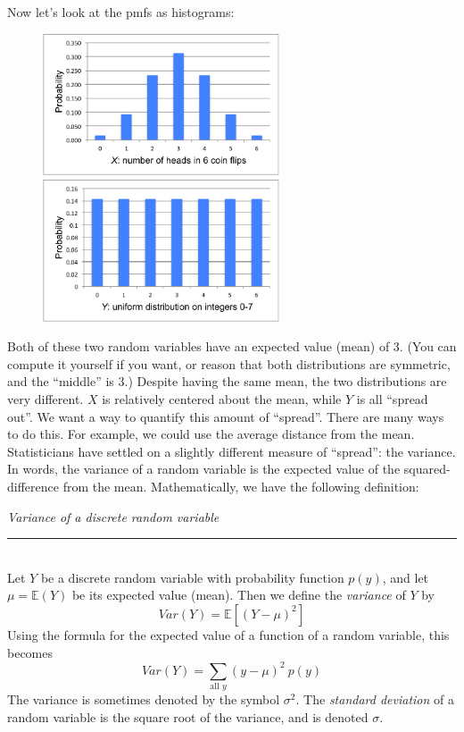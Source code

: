\documentclass[12pt]{article}
\theoremstyle{definition}
\theoremstyle{remark}
\def\E{{\mathbb E}}
\begin{document}
Now let's look at the pmfs as histograms:
\begin{figure}[H]
\centering
\includegraphics[width=7cm]{excelx.pdf}
\includegraphics[width=7cm]{excely.pdf}
\end{figure}

Both of these two random variables have an expected value (mean) of 3. (You can compute it yourself if you want, or reason that both distributions are symmetric, and the ``middle'' is 3.) Despite having the same mean, the two distributions are very different. $X$ is relatively centered about the mean, while $Y$ is all ``spread out''. We want a way to quantify this amount of ``spread''. There are many ways to do this. For example, we could use the average distance from the mean. Statisticians have settled on a slightly different measure of ``spread'': the variance. In words, the variance of a random variable is the expected value of the squared-difference from the mean. Mathematically, we have the following definition:

\begin{framed}
  \emph{Variance of a discrete random variable}\\
  \rule{\dimexpr{}\fboxrule}{.1pt} \\
Let $Y$ be a discrete random variable with probability function $p(y)$, and let $\mu = \E(Y)$ be its expected value (mean). Then we define the \emph{variance} of $Y$ by
\[
Var(Y) = \E[ (Y - \mu)^2 ]
\]
Using the formula for the expected value of a function of a random variable, this becomes
\[
Var(Y) = \sum_{\text{all }y}(y - \mu)^2 \:p(y)
\]
The variance is sometimes denoted by the symbol $\sigma^2$. The \emph{standard deviation} of a random variable is the square root of the variance, and is denoted $\sigma$.
\end{framed}
\end{document}
